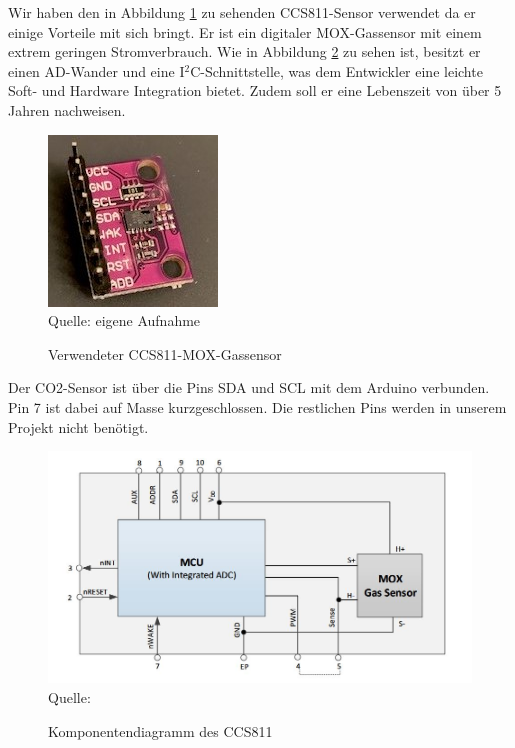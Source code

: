 \label{CCS811}

Wir haben den in Abbildung \ref{fig:CCS811-Bild}  zu sehenden CCS811-Sensor verwendet da er einige Vorteile mit sich bringt. Er ist ein digitaler \ac{MOX}-Gassensor mit einem extrem geringen Stromverbrauch. Wie in Abbildung \ref{fig:ccs811Blockdiagramm} zu sehen ist, besitzt er einen \ac{AD}-Wander und eine I$^2$C-Schnittstelle, was dem Entwickler eine leichte Soft- und Hardware Integration bietet. Zudem soll er eine Lebenszeit von über 5 Jahren nachweisen. \cite[vgl. S. 1]{amsAG.2016} \\

\begin{figure}[!hbt]
	\centering
	\includegraphics[width=0.3\linewidth]{Images/CO2SensorCCS811}
	\footnotesize \\Quelle: eigene Aufnahme
	\caption{Verwendeter CCS811-\ac{MOX}-Gassensor}
	\label{fig:CCS811-Bild}
\end{figure}

Der CO2-Sensor ist über die Pins SDA und SCL mit dem Arduino verbunden. Pin 7 ist dabei auf Masse kurzgeschlossen. Die restlichen Pins werden in unserem Projekt nicht benötigt.

\begin{figure}[!hbt]
	\centering
	\includegraphics[width=0.8\linewidth]{Images/ccs811Blockdiagramm}
	\footnotesize{\\ Quelle: \cite[S. 3]{amsAG.2016}}
	\caption{Komponentendiagramm des CCS811}
	\label{fig:ccs811Blockdiagramm}
\end{figure}

